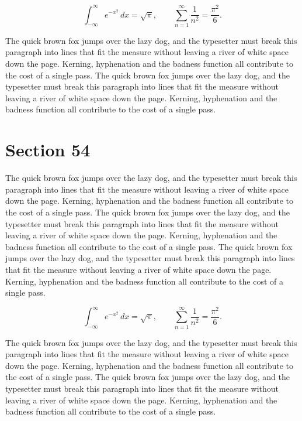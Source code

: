 \documentclass{article}
\begin{document}
\begin{equation}
\int_{-\infty}^{\infty} e^{-x^{2}}\,dx = \sqrt{\pi}, \qquad
\sum_{n=1}^{\infty} \frac{1}{n^{2}} = \frac{\pi^{2}}{6}.
\end{equation}

The quick brown fox jumps over the lazy dog, and the typesetter must break this paragraph into lines that fit the measure without leaving a river of white space down the page. Kerning, hyphenation and the badness function all contribute to the cost of a single pass. The quick brown fox jumps over the lazy dog, and the typesetter must break this paragraph into lines that fit the measure without leaving a river of white space down the page. Kerning, hyphenation and the badness function all contribute to the cost of a single pass. 
\section{Section 54}
The quick brown fox jumps over the lazy dog, and the typesetter must break this paragraph into lines that fit the measure without leaving a river of white space down the page. Kerning, hyphenation and the badness function all contribute to the cost of a single pass. The quick brown fox jumps over the lazy dog, and the typesetter must break this paragraph into lines that fit the measure without leaving a river of white space down the page. Kerning, hyphenation and the badness function all contribute to the cost of a single pass. The quick brown fox jumps over the lazy dog, and the typesetter must break this paragraph into lines that fit the measure without leaving a river of white space down the page. Kerning, hyphenation and the badness function all contribute to the cost of a single pass. 

\begin{equation}
\int_{-\infty}^{\infty} e^{-x^{2}}\,dx = \sqrt{\pi}, \qquad
\sum_{n=1}^{\infty} \frac{1}{n^{2}} = \frac{\pi^{2}}{6}.
\end{equation}

The quick brown fox jumps over the lazy dog, and the typesetter must break this paragraph into lines that fit the measure without leaving a river of white space down the page. Kerning, hyphenation and the badness function all contribute to the cost of a single pass. The quick brown fox jumps over the lazy dog, and the typesetter must break this paragraph into lines that fit the measure without leaving a river of white space down the page. Kerning, hyphenation and the badness function all contribute to the cost of a single pass. 
\end{document}
